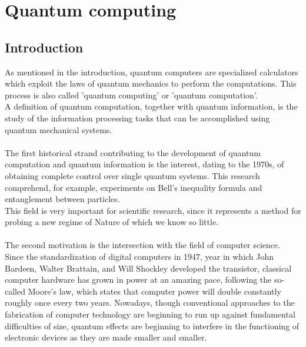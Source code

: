 \chapter{Quantum computing} \label{Quantum computing}

\section{Introduction}
As mentioned in the introduction, quantum computers are specialized calculators which exploit the laws of quantum mechanics to perform the computations. This process is also called 'quantum computing' or 'quantum computation'. \\
A definition of quantum computation, together with quantum information, is the study of the information processing tasks that can be accomplished using quantum mechanical systems. \\
\\
The first historical strand contributing to the development of quantum computation and quantum information is the interest, dating to the 1970s, of obtaining complete control over single quantum systems. This research comprehend, for example, experiments on Bell's inequality formula and entanglement between particles. \\
This field is very important for scientific research, since it represents a method for probing a new regime of Nature of which we know so little. \\
\\
The second motivation is the intersection with the field of computer science. Since the standardization of digital computers in 1947, year in which John Bardeen, Walter Brattain, and Will Shockley developed the transistor, classical computer hardware has grown in power at an amazing pace, following the so-called Moore's law, which states that computer power will double constantly roughly once every two years. Nowadays, though conventional approaches to the fabrication of computer technology are beginning to run up against fundamental difficulties of size, quantum effects are beginning to interfere in the functioning of electronic devices as they are made smaller and smaller. \\
\\
